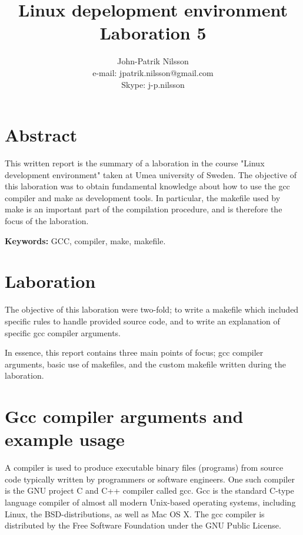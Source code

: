 \documentclass[a4paper,10pt]{article}
\title{Linux depelopment environment \\
	Laboration 5}
\author{John-Patrik Nilsson \\
	e-mail: jpatrik.nilsson@gmail.com \\
	Skype: j-p.nilsson}
\begin{document}
\maketitle

\pagestyle{empty}
\thispagestyle{empty}

\section{Abstract}
This written report is the summary of a laboration in the course "Linux development environment" taken at Umea university of Sweden. The objective of this laboration was to obtain fundamental knowledge about how to use the gcc compiler and make as development tools. In particular, the makefile used by make is an important part of the compilation procedure, and is therefore the focus of the laboration.

\textbf{Keywords:} GCC, compiler, make, makefile. 

\section{Laboration}
The objective of this laboration were two-fold; to write a makefile which included specific rules to handle provided source code, and to write an explanation of specific gcc compiler arguments. 

In essence, this report contains three main points of focus; gcc compiler arguments, basic use of makefiles, and the custom makefile written during the laboration.

\section{Gcc compiler arguments and example usage}
A compiler is used to produce executable binary files (programs) from source code typically written by programmers or software engineers. One such compiler is the GNU project C and C++ compiler called gcc. Gcc is the standard C-type language compiler of almost all modern Unix-based operating systems, including Linux, the BSD-distributions, as well as Mac OS X. The gcc compiler is distributed by the Free Software Foundation under the GNU Public License.
\end{document}
